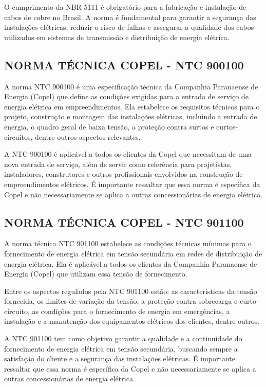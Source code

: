 O cumprimento da NBR-5111 é obrigatório para a fabricação e instalação de cabos de cobre no Brasil. A norma é fundamental para garantir a segurança das instalações elétricas, reduzir o risco de falhas e assegurar a qualidade dos cabos utilizados em sistemas de transmissão e distribuição de energia elétrica.

\subsection{NORMA TÉCNICA COPEL - NTC 900100}

A norma NTC 900100 é uma especificação técnica da Companhia Paranaense de Energia (Copel) que define as condições exigidas para a entrada de serviço de energia elétrica em empreendimentos. Ela estabelece os requisitos técnicos para o projeto, construção e montagem das instalações elétricas, incluindo a entrada de energia, o quadro geral de baixa tensão, a proteção contra surtos e curtos-circuitos, dentre outros aspectos relevantes.

A NTC 900100 é aplicável a todos os clientes da Copel que necessitam de uma nova entrada de serviço, além de servir como referência para projetistas, instaladores, construtores e outros profissionais envolvidos na construção de empreendimentos elétricos. É importante ressaltar que essa norma é específica da Copel e não necessariamente se aplica a outras concessionárias de energia elétrica.

\subsection{NORMA TÉCNICA COPEL - NTC 901100}

A norma técnica NTC 901100 estabelece as condições técnicas mínimas para o fornecimento de energia elétrica em tensão secundária em redes de distribuição de energia elétrica. Ela é aplicável a todos os clientes da Companhia Paranaense de Energia (Copel) que utilizam essa tensão de fornecimento.

Entre os aspectos regulados pela NTC 901100 estão: as características da tensão fornecida, os limites de variação da tensão, a proteção contra sobrecarga e curto-circuito, as condições para o fornecimento de energia em emergências, a instalação e a manutenção dos equipamentos elétricos dos clientes, dentre outros.

A NTC 901100 tem como objetivo garantir a qualidade e a continuidade do fornecimento de energia elétrica em tensão secundária, buscando sempre a satisfação do cliente e a segurança das instalações elétricas. É importante ressaltar que essa norma é específica da Copel e não necessariamente se aplica a outras concessionárias de energia elétrica.


